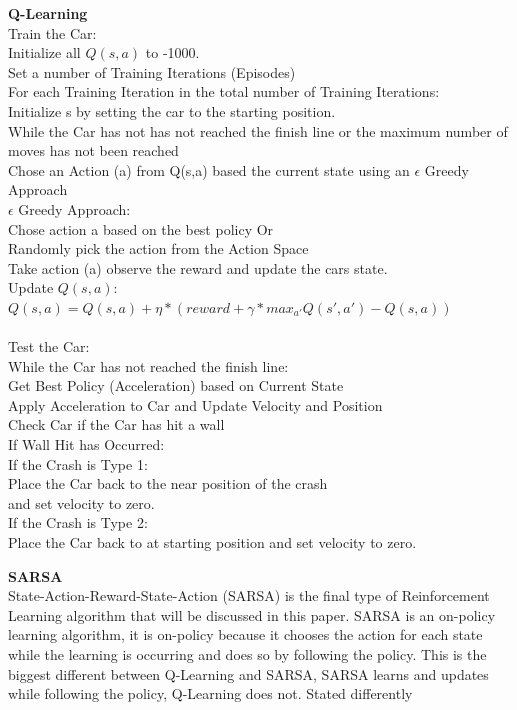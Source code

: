 \documentclass[twoside,11pt]{article}
\newcommand\tab[1][1cm]{\hspace*{#1}}
\begin{document}
\textbf{Q-Learning}\\
Train the Car:\\
\tab Initialize all $Q(s,a)$ to -1000.\\
\tab Set a number of Training Iterations (Episodes)\\
\tab For each Training Iteration in the total number of Training Iterations:\\
\tab \tab Initialize s by setting the car to the starting position.\\
\tab \tab While the Car has not has not reached the finish line or the maximum number of moves has not been reached\\
\tab \tab \tab Chose an Action (a) from Q(s,a) based the current state using an $\epsilon$ Greedy Approach \\
\tab \tab \tab $\epsilon$ Greedy Approach:\\
\tab \tab \tab \tab Chose action a based on the best policy
\tab \tab \tab \tab Or\\
\tab \tab \tab \tab Randomly pick the action from the Action Space\\
\tab \tab \tab Take action (a) observe the reward and update the cars state.\\
\tab \tab \tab Update $Q(s,a)$:\\
\tab \tab \tab \tab  $Q(s,a) = Q(s,a) + \eta*(reward + \gamma*max_{a'}Q(s',a') - Q(s,a))$\\
\\
Test the Car:\\
\tab While the Car has not reached the finish line:\\
\tab \tab Get Best Policy (Acceleration) based on Current State\\
\tab \tab Apply Acceleration to Car and Update Velocity and Position\\
\tab \tab Check Car if the Car has hit a wall\\
\tab \tab If Wall Hit has Occurred:\\
\tab \tab \tab If the Crash is Type 1:\\
\tab \tab \tab \tab Place the Car back to the near position of the crash\\ 
\tab \tab \tab \tab and set velocity to zero.\\
\tab \tab \tab If the Crash is Type 2:\\
\tab \tab \tab \tab Place the Car back to at starting position and set velocity to zero.\\
\newpage

\textbf{SARSA}\\
State-Action-Reward-State-Action (SARSA) is the final type of Reinforcement Learning algorithm that will be discussed in this paper. SARSA is an on-policy learning algorithm, it is on-policy because it chooses the action for each state while the learning is occurring and does so by following the policy. This is the biggest different between Q-Learning and SARSA, SARSA learns and updates while following the policy, Q-Learning does not. Stated differently \\
\end{document}
